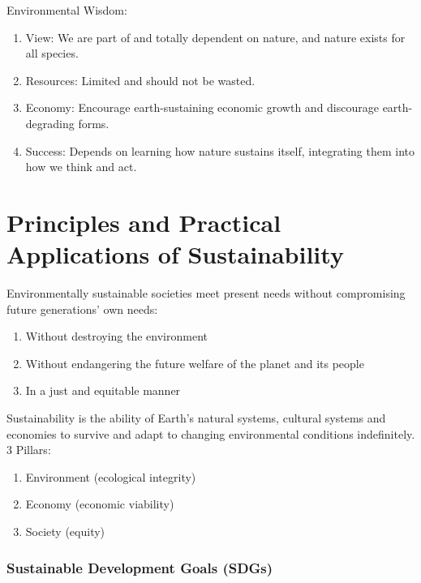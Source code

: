 \documentclass[12pt, a4paper]{article}
\begin{document}
\begin{multicols*}{3}
Environmental Wisdom:
\begin{enumerate}[\roman*.]
  \item View: We are part of and totally dependent on nature, and nature exists for all species. 
  \item Resources: Limited and should not be wasted.
  \item Economy: Encourage earth-sustaining economic growth and discourage earth-degrading forms.
  \item Success: Depends on learning how nature sustains itself, integrating them into how we think and act.
\end{enumerate}

\colbreak
\section{Principles and Practical Applications of Sustainability}
Environmentally sustainable societies meet present needs without compromising future generations' own needs:
\begin{enumerate}[\roman*.]
  \item Without destroying the environment
  \item Without endangering the future welfare of the planet and its people 
  \item In a just and equitable manner
\end{enumerate}

Sustainability is the ability of Earth's natural systems, cultural systems and economies to survive and adapt to changing environmental conditions indefinitely. 3 Pillars:
\begin{enumerate}[\roman*.]
  \item Environment (ecological integrity)
  \item Economy (economic viability)
  \item Society (equity)
\end{enumerate}

\subsubsection{Sustainable Development Goals (SDGs)}


\end{multicols*}
\end{document}
